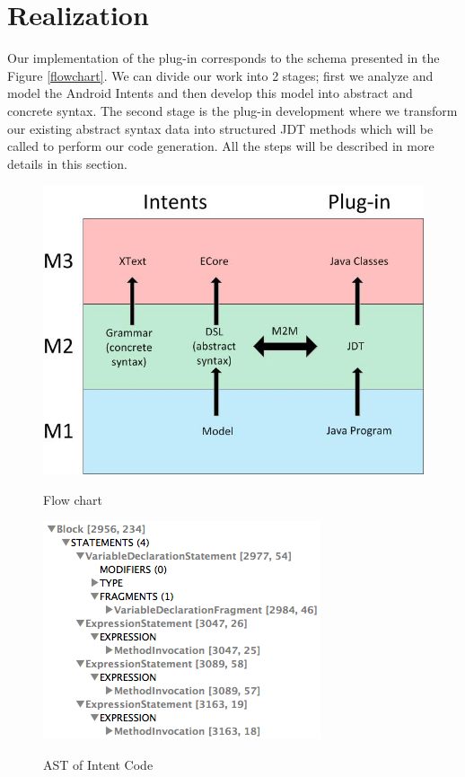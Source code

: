 \section{Realization}
\label{realisation}

Our implementation of the plug-in corresponds to the schema presented in the Figure \ref{flowchart}. We can divide our work into 2 stages; first we analyze and model the Android Intents and then develop this model into abstract and concrete syntax. The second stage is the plug-in development where we transform our existing abstract syntax data into structured JDT methods which will be called to perform our code generation. All the steps will be described in more details in this section.  

\begin{figure}[t]
\begin{minipage}{0.5\textwidth}
\label{flowchart}
  \centering
    \includegraphics[width=.95\textwidth]{flowchart}
  \caption{Flow chart}
\end{minipage}%
\begin{minipage}{0.5\textwidth}
\label{asttreeview}
  \centering
    \includegraphics[width=.95\textwidth]{ast}
  \caption{AST of Intent Code}
\end{minipage}%
\end{figure}

